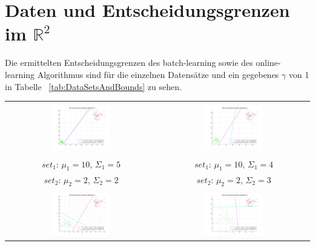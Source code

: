 \documentclass[]{report}
\begin{document}
\section{Daten und Entscheidungsgrenzen im $\mathbb{R}^2$}

Die ermittelten Entscheidungsgrenzen des batch-learning sowie des online-learning Algorithmus sind f\"ur die einzelnen Datens\"atze und ein gegebenes $\gamma$ von 1 in Tabelle ~\ref{tab:DataSetsAndBounds} zu sehen.

\begin{table}[h]
\begin{tabular}{| c | c |}
\hline
 & \\
\includegraphics[width=0.4\textwidth]{./images/DataSetAndDecisionBoundary_110.jpg} & \includegraphics[width=0.4\textwidth]{./images/DataSetAndDecisionBoundary_210.jpg} \\
 & \\
 $set_{1}$: $\mu_1=10$, $\Sigma_1=5$ & $set_{1}$: $\mu_1=10$, $\Sigma_1=4$ \\
 $set_{2}$: $\mu_2=2$, $\Sigma_2=2$ & $set_{2}$: $\mu_2=2$, $\Sigma_2=3$ \\
\hline
 & \\
\includegraphics[width=0.4\textwidth]{./images/DataSetAndDecisionBoundary_310.jpg} & \includegraphics[width=0.4\textwidth]{./images/DataSetAndDecisionBoundary_410.jpg} \\

\end{tabular}
\end{table}
\end{document}
